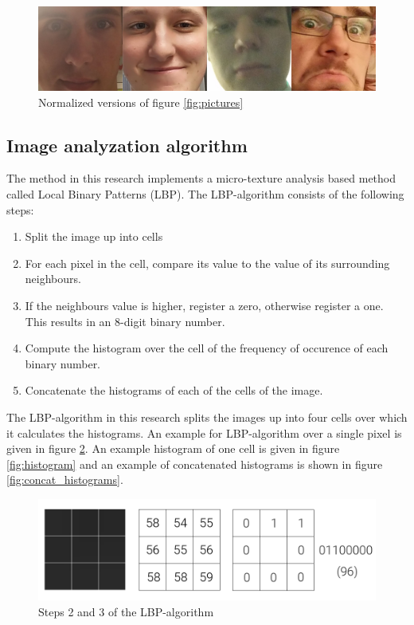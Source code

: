 \documentclass{sig-alternate-br}
\begin{document}
\begin{figure}[h]
	\includegraphics[scale=0.2]{normalized}
	\caption{Normalized versions of figure \ref{fig:pictures}}
	\label{fig:normalized}
\end{figure}


\subsection{Image analyzation algorithm} \label{lbp}
The method in this research implements a micro-texture analysis based method called Local Binary Patterns (LBP). The LBP-algorithm consists of the following steps:
\begin{enumerate}
	\item Split the image up into cells
	\item For each pixel in the cell, compare its value to the value of its surrounding neighbours.
	\item If the neighbours value is higher, register a zero, otherwise register a one. This results in an 8-digit binary number.
	\item Compute the histogram over the cell of the frequency of occurence of each binary number.
	\item Concatenate the histograms of each of the cells of the image.
\end{enumerate}

The LBP-algorithm in this research splits the images up into four cells over which it calculates the histograms. An example for LBP-algorithm over a single pixel is given in figure \ref{fig:lbp_pixel}. An example histogram of one cell is given in figure \ref{fig:histogram} and an example of concatenated histograms is shown in figure \ref{fig:concat_histograms}.

\begin{figure}[h]
	\includegraphics[scale=0.2]{lbp_pixel}
	\caption{Steps 2 and 3 of the LBP-algorithm}
	\label{fig:lbp_pixel}
\end{figure}
\end{document}
